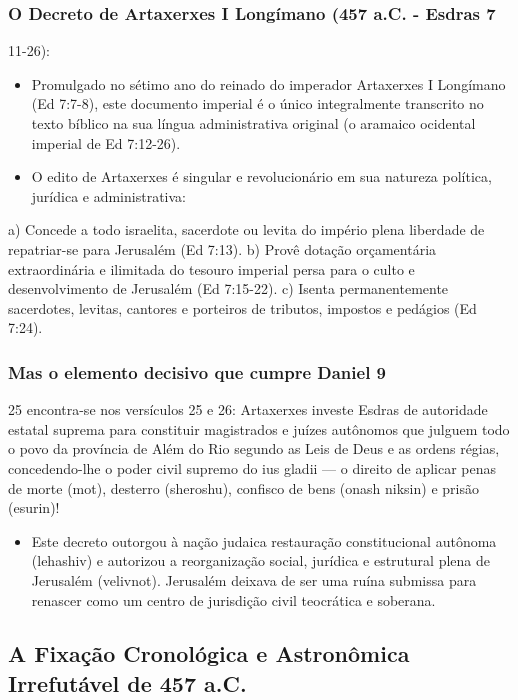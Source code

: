 \subsubsection*{O Decreto de Artaxerxes I Longímano (457 a.C. - Esdras 7}
11-26):
\begin{itemize}
  \item Promulgado no sétimo ano do reinado do imperador Artaxerxes I Longímano (Ed 7:7-8), este documento imperial é o único integralmente transcrito no texto bíblico na sua língua administrativa original (o aramaico ocidental imperial de Ed 7:12-26).
  \item O edito de Artaxerxes é singular e revolucionário em sua natureza política, jurídica e administrativa:
\end{itemize}

a) Concede a todo israelita, sacerdote ou levita do império plena liberdade de repatriar-se para Jerusalém (Ed 7:13).
b) Provê dotação orçamentária extraordinária e ilimitada do tesouro imperial persa para o culto e desenvolvimento de Jerusalém (Ed 7:15-22).
c) Isenta permanentemente sacerdotes, levitas, cantores e porteiros de tributos, impostos e pedágios (Ed 7:24).

\subsubsection*{Mas o elemento decisivo que cumpre Daniel 9}
25 encontra-se nos versículos 25 e 26: Artaxerxes investe Esdras de autoridade estatal suprema para constituir magistrados e juízes autônomos que julguem todo o povo da província de Além do Rio segundo as Leis de Deus e as ordens régias, concedendo-lhe o poder civil supremo do ius gladii — o direito de aplicar penas de morte (mot), desterro (sheroshu), confisco de bens (onash niksin) e prisão (esurin)!
\begin{itemize}
  \item Este decreto outorgou à nação judaica restauração constitucional autônoma (lehashiv) e autorizou a reorganização social, jurídica e estrutural plena de Jerusalém (velivnot). Jerusalém deixava de ser uma ruína submissa para renascer como um centro de jurisdição civil teocrática e soberana.
\end{itemize}




\subsection{A Fixação Cronológica e Astronômica Irrefutável de 457 a.C.}


